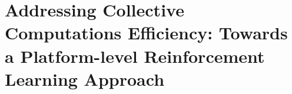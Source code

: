 \newcommand{\export}{export}
\newcommand{\round}{round}

\newcommand{\decision}[1]{{\color{red} #1}}
\newcommand{\mtext}[1]{\text{\texttt{#1}}}
\newenvironment{iequation}{\(}{\). }
\def\tablename{Table}
\sloppypar

\newcommand{\scafiinline}[1]{\lstinline[language=scafi]$#1$}


\chapter[Addressing Collective Computations Efficiency]{Addressing Collective Computations Efficiency: Towards a Platform-level Reinforcement Learning Approach}
\minitoc%
%

